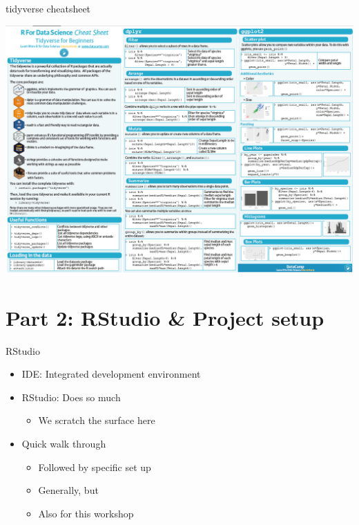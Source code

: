 \documentclass[ignorenonframetext,]{beamer}
\providecommand{\tightlist}{%
  \setlength{\itemsep}{0pt}\setlength{\parskip}{0pt}}
\begin{document}
\begin{frame}{tidyverse cheatsheet}
\protect\hypertarget{tidyverse-cheatsheet}{}

\includegraphics{../external/images/r_cheatsheet_tidy.PNG}

\end{frame}

\hypertarget{part-2-rstudio-project-setup}{%
\section{Part 2: RStudio \& Project
setup}\label{part-2-rstudio-project-setup}}

\begin{frame}{RStudio}
\protect\hypertarget{rstudio}{}

\begin{itemize}
\tightlist
\item
  IDE: Integrated development environment
\item
  RStudio: Does so much

  \begin{itemize}
  \tightlist
  \item
    We scratch the surface here
  \end{itemize}
\item
  Quick walk through

  \begin{itemize}
  \tightlist
  \item
    Followed by specific set up
  \item
    Generally, but
  \item
    Also for this workshop
  \end{itemize}
\end{itemize}

\end{frame}
\end{document}
